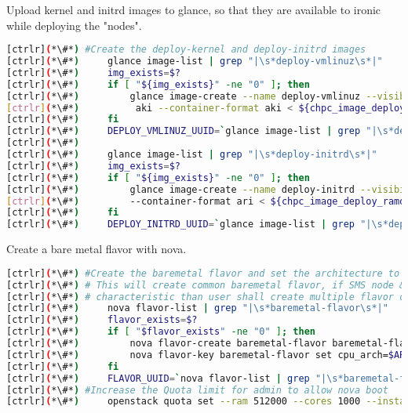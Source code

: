 	Upload kernel and initrd images to glance, so that they are available to ironic while deploying the "nodes".


\begin{lstlisting}[language=bash,keywords={}]
[ctrlr](*\#*) #Create the deploy-kernel and deploy-initrd images
[ctrlr](*\#*)     glance image-list | grep "|\s*deploy-vmlinuz\s*|"
[ctrlr](*\#*)     img_exists=$?
[ctrlr](*\#*)     if [ "${img_exists}" -ne "0" ]; then
[ctrlr](*\#*)         glance image-create --name deploy-vmlinuz --visibility public --disk-format \
[ctrlr](*\#*)          aki --container-format aki < ${chpc_image_deploy_kernel}
[ctrlr](*\#*)     fi
[ctrlr](*\#*)     DEPLOY_VMLINUZ_UUID=`glance image-list | grep "|\s*deploy-vmlinuz\s*|" | awk '{print $2}'`
[ctrlr](*\#*) 
[ctrlr](*\#*)     glance image-list | grep "|\s*deploy-initrd\s*|"
[ctrlr](*\#*)     img_exists=$?
[ctrlr](*\#*)     if [ "${img_exists}" -ne "0" ]; then
[ctrlr](*\#*)         glance image-create --name deploy-initrd --visibility public --disk-format ari \
[ctrlr](*\#*)         --container-format ari < ${chpc_image_deploy_ramdisk}
[ctrlr](*\#*)     fi
[ctrlr](*\#*)     DEPLOY_INITRD_UUID=`glance image-list | grep "|\s*deploy-initrd\s*|" | awk '{print $2}'`
\end{lstlisting} 

	Create a bare metal flavor with nova.


\begin{lstlisting}[language=bash,keywords={}]
[ctrlr](*\#*) #Create the baremetal flavor and set the architecture to x86_64
[ctrlr](*\#*) # This will create common baremetal flavor, if SMS node & compute has different
[ctrlr](*\#*) # characteristic than user shall create multiple flavor one each characterisitc
[ctrlr](*\#*)     nova flavor-list | grep "|\s*baremetal-flavor\s*|"
[ctrlr](*\#*)     flavor_exists=$?
[ctrlr](*\#*)     if [ "$flavor_exists" -ne "0" ]; then
[ctrlr](*\#*)         nova flavor-create baremetal-flavor baremetal-flavor ${RAM_MB} ${DISK_GB} ${CPU}
[ctrlr](*\#*)         nova flavor-key baremetal-flavor set cpu_arch=$ARCH
[ctrlr](*\#*)     fi
[ctrlr](*\#*)     FLAVOR_UUID=`nova flavor-list | grep "|\s*baremetal-flavor\s*|" | awk '{print $2}'`
[ctrlr](*\#*) #Increase the Quota limit for admin to allow nova boot
[ctrlr](*\#*)     openstack quota set --ram 512000 --cores 1000 --instances 100 admin
\end{lstlisting} 

